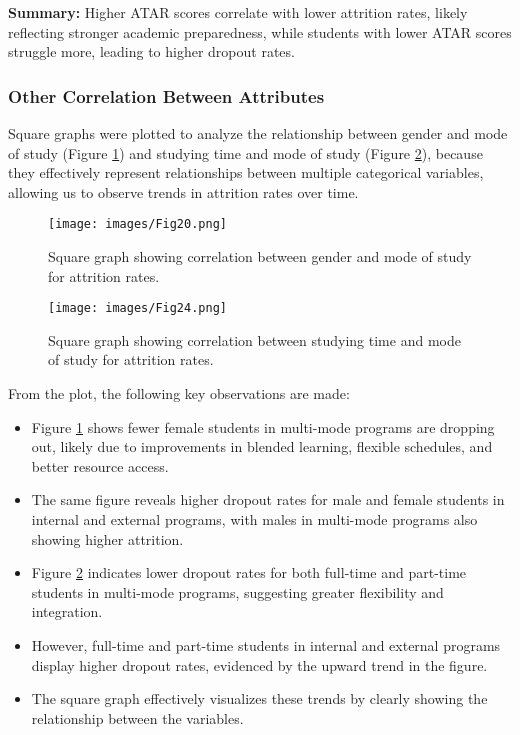 \documentclass[conference]{IEEEtran}
\begin{document}
\textbf{Summary:} Higher ATAR scores correlate with lower attrition rates, likely reflecting stronger academic preparedness, while students with lower ATAR scores struggle more, leading to higher dropout rates.

\subsubsection{Other Correlation Between Attributes}
Square graphs were plotted to analyze the relationship between gender and mode of study (Figure \ref{fig:square2}) and studying time and mode of study (Figure \ref{fig:square3}), because they effectively represent relationships between multiple categorical variables, allowing us to observe trends in attrition rates over time.

\begin{figure}[H] 
    \centering 
    \texttt{[image: images/Fig20.png]} \caption{Square graph showing correlation between gender and mode of study for attrition rates.} 
    \label{fig:square2} 
\end{figure}

\begin{figure}[H] 
    \centering 
    \texttt{[image: images/Fig24.png]} \caption{Square graph showing correlation between studying time and mode of study for attrition rates.} 
    \label{fig:square3} 
\end{figure}

\par From the plot, the following key observations are made: 
\begin{itemize} 
    \item Figure \ref{fig:square2} shows fewer female students in multi-mode programs are dropping out, likely due to improvements in blended learning, flexible schedules, and better resource access. 
    \item The same figure reveals higher dropout rates for male and female students in internal and external programs, with males in multi-mode programs also showing higher attrition. 
    \item Figure \ref{fig:square3} indicates lower dropout rates for both full-time and part-time students in multi-mode programs, suggesting greater flexibility and integration. 
    \item However, full-time and part-time students in internal and external programs display higher dropout rates, evidenced by the upward trend in the figure. 
    \item The square graph effectively visualizes these trends by clearly showing the relationship between the variables. \end{itemize}
\end{document}
